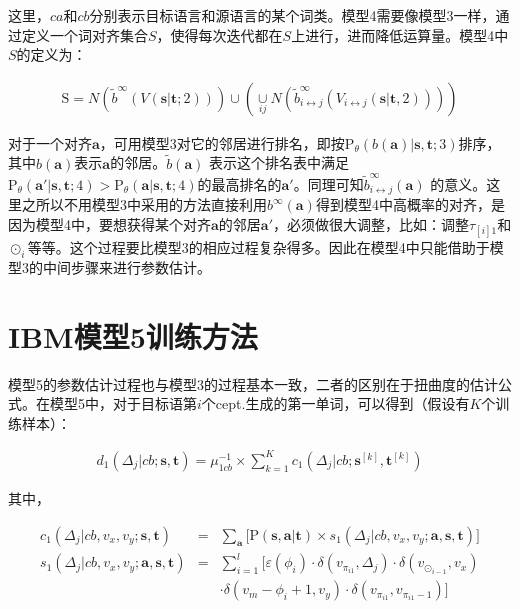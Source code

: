 \begin{appendices}
\noindent 这里，$ca$和$cb$分别表示目标语言和源语言的某个词类。模型4需要像模型3一样，通过定义一个词对齐集合$S$，使得每次迭代都在$S$上进行，进而降低运算量。模型4中$S$的定义为：

\begin{eqnarray}
\textrm{S} = N(\tilde{b}^{\infty}(V(\mathbf{s}|\mathbf{t};2))) \cup (\mathop{\cup}\limits_{ij} N(\tilde{b}_{i \leftrightarrow j}^{\infty}(V_{i \leftrightarrow j}(\mathbf{s}|\mathbf{t},2))))
\label{eq:1.22}
\end{eqnarray}

\parinterval 对于一个对齐$\mathbf{a}$，可用模型3对它的邻居进行排名，即按$\textrm{P}_{\theta}(b(\mathbf{a})|\mathbf{s},\mathbf{t};3)$排序，其中$b(\mathbf{a})$表示$\mathbf{a}$的邻居。$\tilde{b}(\mathbf{a})$ 表示这个排名表中满足$\textrm{P}_{\theta}(\mathbf{a}'|\mathbf{s},\mathbf{t};4) > \textrm{P}_{\theta}⁡(\mathbf{a}|\mathbf{s},\mathbf{t};4)$的最高排名的$\mathbf{a}'$。同理可知$\tilde{b}_{i \leftrightarrow j}^{\infty}(\mathbf{a})$ 的意义。这里之所以不用模型3中采用的方法直接利用$b^{\infty}(\mathbf{a})$得到模型4中高概率的对齐，是因为模型4中，要想获得某个对齐$\mathbf{a}$的邻居$\mathbf{a}'$，必须做很大调整，比如：调整$\tau_{[i]1}$和$\odot_{i}$等等。这个过程要比模型3的相应过程复杂得多。因此在模型4中只能借助于模型3的中间步骤来进行参数估计。
\setlength{\belowdisplayskip}{3pt}%


\section{IBM模型5训练方法}
\parinterval 模型5的参数估计过程也与模型3的过程基本一致，二者的区别在于扭曲度的估计公式。在模型5中，对于目标语第$i$个cept.生成的第一单词，可以得到（假设有$K$个训练样本）：

\begin{eqnarray}
d_1(\Delta_j|cb;\mathbf{s},\mathbf{t}) = \mu_{1cb}^{-1} \times \sum_{k=1}^{K}c_1(\Delta_j|cb;\mathbf{s}^{[k]},\mathbf{t}^{[k]})
\label{eq:1.23}
\end{eqnarray}

其中，

\begin{eqnarray}
c_1(\Delta_j|cb,v_x,v_y;\mathbf{s},\mathbf{t})                   & = & \sum_{\mathbf{a}}\Big[ \textrm{P}(\mathbf{s},\mathbf{a}|\mathbf{t}) \times s_1(\Delta_j|cb,v_x,v_y;\mathbf{a},\mathbf{s},\mathbf{t}) \Big] \label{eq:1.24} \\
s_1(\Delta_j|cb,v_x,v_y;\mathbf{a},\mathbf{s},\mathbf{t}) & = & \sum_{i=1}^l \Big [ \varepsilon(\phi_i) \cdot \delta(v_{\pi_{i1}},\Delta_j) \cdot \delta(v_{\odot _{i-1}},v_x) \nonumber \\
                                                                                          &    & \cdot \delta(v_m-\phi_i+1,v_y) \cdot \delta(v_{\pi_{i1}},v_{\pi_{i1}-1} )\Big] \label{eq:1.25}
\end{eqnarray}



\end{appendices}
